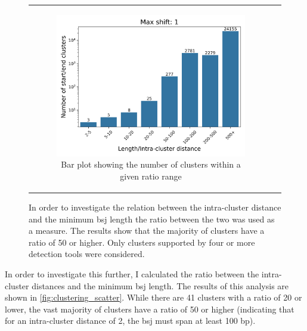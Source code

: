 \begin{figure}[ht]
\begin{tabular}{cc}
\begin{subfigure}{0.5\textwidth}
            \includegraphics[width=\linewidth]{chapters/4_results_and_discussion/figures/detection/distances/diff_1_bar.png}
            \caption{Bar plot showing the number of clusters within a given
                ratio range}
            \label{fig:clustering_bar}
        \end{subfigure}
    \end{tabular}
    \caption{In order to investigate the relation between the intra-cluster
        distance and the minimum \gls{bsj} length the ratio between the two was
        used as a measure.
        The results show that the majority of clusters have a ratio of 50 or higher.
        Only clusters supported by four or more detection tools were considered.
    }
    \label{fig:clustering}
\end{figure}

In order to investigate this further, I calculated the ratio between the
intra-cluster distances and the minimum \gls{bsj} length.
The results of this analysis are shown in \cref{fig:clustering_scatter}.
While there are 41 clusters with a ratio of 20 or lower, the vast majority of
clusters have a ratio of 50 or higher (indicating that for an intra-cluster
distance of 2, the \gls{bsj} must span at least 100 bp).

